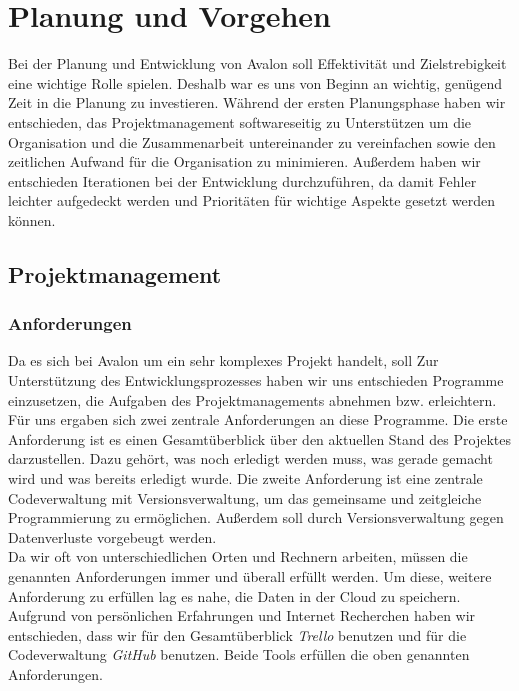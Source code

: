 
\chapter{Planung und Vorgehen}

Bei der Planung und Entwicklung von Avalon soll Effektivität und Zielstrebigkeit eine wichtige Rolle spielen. Deshalb war es uns von Beginn an wichtig, genügend Zeit in die Planung zu investieren. Während der ersten Planungsphase haben wir entschieden, das Projektmanagement softwareseitig zu Unterstützen um die Organisation und die  Zusammenarbeit untereinander zu vereinfachen sowie den zeitlichen Aufwand für die Organisation zu minimieren. Außerdem haben wir entschieden Iterationen bei der Entwicklung durchzuführen, da damit Fehler leichter aufgedeckt werden und Prioritäten  für wichtige Aspekte gesetzt werden können.

\section{Projektmanagement}

\subsection{Anforderungen}

Da es sich bei Avalon um ein sehr komplexes Projekt handelt, soll  Zur Unterstützung des Entwicklungsprozesses haben wir uns entschieden Programme einzusetzen, die Aufgaben des Projektmanagements abnehmen bzw. erleichtern.
Für uns ergaben sich zwei zentrale Anforderungen an diese Programme. Die erste Anforderung ist es einen Gesamtüberblick über den aktuellen Stand des Projektes darzustellen. Dazu gehört, was  noch erledigt werden muss, was  gerade gemacht wird und was  bereits erledigt wurde.
Die zweite Anforderung ist eine zentrale Codeverwaltung mit Versionsverwaltung, um das gemeinsame und zeitgleiche Programmierung zu ermöglichen. Außerdem soll durch Versionsverwaltung gegen Datenverluste vorgebeugt werden.\\
Da wir oft von unterschiedlichen Orten und Rechnern arbeiten, müssen die genannten Anforderungen immer und überall erfüllt werden. Um diese, weitere Anforderung zu erfüllen lag es nahe, die Daten in der Cloud zu speichern.\\
Aufgrund von persönlichen Erfahrungen und Internet Recherchen haben wir entschieden, dass wir für den Gesamtüberblick \textit{Trello} benutzen und für die Codeverwaltung \textit{GitHub} benutzen. Beide Tools erfüllen die oben genannten Anforderungen.


